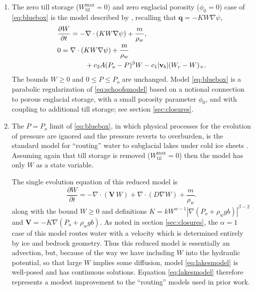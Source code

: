 \documentclass[gmd]{copernicus}   %
\newcommand{\text}{\textrm}
\newcommand\bv{\mathbf{v}}
\newcommand\bV{\mathbf{V}}
\newcommand\bq{\mathbf{q}}
\newcommand{\Div}{\nabla\cdot}
\newcommand{\grad}{\nabla}
\newcommand{\Wtilmax}{W_{\text{til}}^{\text{max}}}
\begin{document}
\renewcommand{\labelenumi}{\textbf{(\roman{enumi})}}
\begin{enumerate}
\item The zero till storage ($\Wtilmax=0$) and zero englacial porosity ($\phi_0=0$) case of \eqref{eq:bluebox} is the model described by \cite{Schoofetal2012}, recalling that $\bq = - K W \grad \psi$,
\begin{align}
&\frac{\partial W}{\partial t} = - \Div\left( K W \grad \psi \right) + \frac{m}{\rho_w}, \label{eq:schoofsmodel} \\
&0 = \Div \left( K W \grad \psi \right) + \frac{m}{\rho_w} \notag \\
&\qquad \qquad + c_2 A (P_o - P)^3 W - c_1 |\bv_b| (W_r - W)_+.  \notag
\end{align}
The bounds $W \ge 0$ and $0 \le P \le P_o$ are unchanged.  Model \eqref{eq:bluebox} is a parabolic regularization of \eqref{eq:schoofsmodel} based on a notional connection to porous englacial storage, with a small porosity parameter $\phi_0$, and with coupling to additional till storage; see section \ref{sec:closures}.

\item The $P=P_o$ limit of \eqref{eq:bluebox}, in which physical processes for the evolution of pressure are ignored and the pressure reverts to overburden, is the standard model for ``routing'' water to subglacial lakes under cold ice sheets \citep{Siegertetal2009,Livingstoneetal2013}.  Assuming again that till storage is removed ($\Wtilmax=0$) then the model has only $W$ as a state variable.

The single evolution equation of this reduced model is
\begin{equation}
\frac{\partial W}{\partial t} = - \Div\left(\bV\, W\right) + \Div \left(D \grad W\right) + \frac{m}{\rho_w}. \label{eq:lakesmodel}
\end{equation}
along with the bound $W \ge 0$ and definitions $K = k W^{\alpha-1} \left|\grad (P_o + \rho_w g b)\right|^{\beta-2}$ and $\bV = - K \grad \left(P_o + \rho_w g b\right)$.  As noted in section \ref{sec:closures}, the $\alpha=1$ case of this model routes water with a velocity which is determined entirely by ice and bedrock geometry.  Thus this reduced model is essentially an advection, but, because of the way we have including $W$ into the hydraulic potential, so that large $W$ implies some diffusion, model \eqref{eq:lakesmodel} is well-posed and has continuous solutions.  Equation \eqref{eq:lakesmodel} therefore represents a modest improvement to the ``routing'' models used in prior work.


\end{enumerate}
\end{document}
